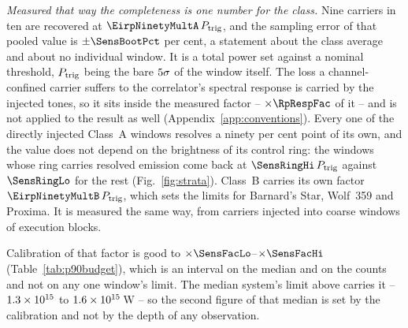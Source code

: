 \emph{Measured that way the completeness is one number for the class.} Nine
carriers in ten are recovered at $\EirpNinetyMultA\,P_{\rm trig}$, and the
sampling error of that pooled value is $\pm\SensBootPct$ per
cent, a statement about the class average and about no individual
window. It is a
total power set against a nominal threshold, $P_{\rm trig}$ being the bare
$5\sigma$ of the window itself. The loss a channel-confined
carrier suffers to the correlator's spectral response is carried by the
injected tones, so it sits inside the measured factor -- $\times\RpRespFac$
of it -- and is not applied to the result as well
(Appendix~\ref{app:conventions}). Every one of the \SensNInj{} directly
injected Class~A windows resolves a ninety per cent point of its own, and the
value does not depend on the brightness of its control ring: the
\SensNRingHi{} windows whose ring carries resolved emission come back at
$\SensRingHi\,P_{\rm trig}$ against $\SensRingLo$ for the rest
(Fig.~\ref{fig:strata}). Class~B carries its own factor $\EirpNinetyMultB\,P_{\rm trig}$, which
sets the limits for Barnard's Star, Wolf~359 and Proxima. It is measured the
same way, from \SensNToneCoarse{} carriers injected into \SensNInjCoarse{}
coarse windows of \SensNInjCoarseBlock{} execution blocks.

Calibration of that factor is good to
$\times\SensFacLo$--$\times\SensFacHi$ (Table~\ref{tab:p90budget}), which is
an interval on the median and on the counts and not on any one window's
limit. The median system's limit above carries it -- $1.3\times10^{15}$ to
$1.6\times10^{15}$\,W -- so the second figure of that median is set by the
calibration and not by the depth of any observation.

